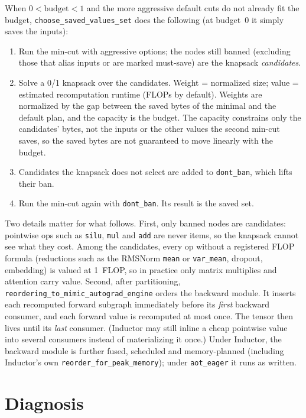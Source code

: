 \documentclass[10pt]{article}
\newcommand{\code}[1]{\texttt{#1}}
\begin{document}
When $0<\text{budget}<1$ and the more aggressive default cuts do not already fit the budget,
\code{choose\_saved\_\allowbreak values\_set} does the following (at budget~0 it simply saves the inputs):
\begin{enumerate}
\item Run the min-cut with aggressive options; the nodes still banned (excluding those that alias inputs or are marked
must-save) are the knapsack \emph{candidates}.
\item Solve a 0/1 knapsack over the candidates. Weight = normalized size; value = estimated recomputation runtime (FLOPs by
default). Weights are normalized by the gap between the saved bytes of the minimal and the default plan, and the
capacity is the budget. The capacity constrains only the candidates' bytes, not the inputs or the other values the second
min-cut saves, so the saved bytes are not guaranteed to move linearly with the budget.
\item Candidates the knapsack does not select are added to \code{dont\_ban}, which lifts their ban.
\item Run the min-cut again with \code{dont\_ban}. Its result is the saved set.
\end{enumerate}
Two details matter for what follows. First, only banned nodes are candidates: pointwise ops such as \code{silu},
\code{mul} and \code{add} are never items, so the knapsack cannot see what they cost. Among the candidates, every op
without a registered FLOP formula (reductions such as the RMSNorm \code{mean} or \code{var\_mean}, dropout, embedding) is
valued at 1~FLOP, so in practice only matrix multiplies and attention carry value. Second, after partitioning,
\code{reordering\_to\_mimic\allowbreak\_autograd\_engine} orders the backward module. It inserts each recomputed forward subgraph
immediately before its \emph{first} backward consumer, and each forward value is recomputed at most once.
The tensor then lives until its \emph{last} consumer. (Inductor may still inline a cheap pointwise value into several
consumers instead of materializing it once.)
Under Inductor, the backward module is further fused, scheduled and memory-planned (including Inductor's own
\code{reorder\_for\_peak\_memory}); under \code{aot\_eager} it runs as written.

\section{Diagnosis}
\label{sec:diagnosis}
\end{document}
